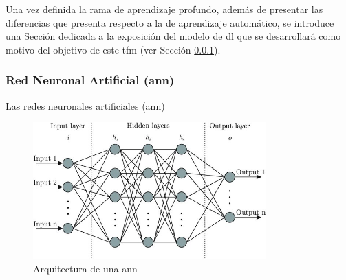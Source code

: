 \vspace{3mm}

Una vez definida la rama de aprendizaje profundo, además de presentar las diferencias que presenta respecto a la de aprendizaje automático, se introduce una Sección dedicada a la exposición del modelo de \gls{dl} que se desarrollará como motivo del objetivo de este \gls{tfm} (ver Sección \ref{sec:dlann}). 

\subsubsection{Red Neuronal Artificial (\acrshort{ann})}
\label{sec:dlann}

Las redes neuronales artificiales (\gls{ann})










\vspace{3mm}

\begin{figure}[h!]
    \centering
    \includegraphics[width=0.8\textwidth]{img/teoria/ann.jpg}
    \caption{Arquitectura de una \acrshort{ann} \cite{ann}}
    \label{fig:features}
\end{figure}

\vspace{3mm}







